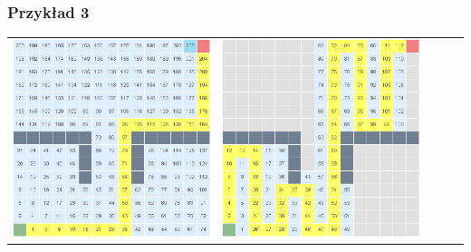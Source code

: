 \documentclass{article}
\begin{document}
\subsubsection{Przykład 3}
\begin{center}
\begin{tabular}{c c c c c}
\includegraphics[scale=0.15]{images/scr10.png} &
\includegraphics[scale=0.15]{images/scr11.png} &

\end{tabular}
\end{center}
\end{document}
